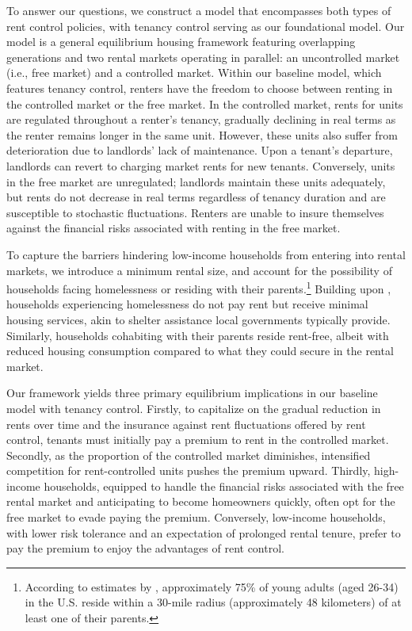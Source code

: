 \documentclass[parskip=full]{article}
\begin{document}
To answer our questions, we construct a model that encompasses both types of rent control policies, with tenancy control serving as our foundational model. Our model is a general equilibrium housing framework featuring overlapping generations and two rental markets operating in parallel: an uncontrolled market (i.e., free market) and a controlled market. Within our baseline model, which features tenancy control, renters have the freedom to choose between renting in the controlled market or the free market. In the controlled market, rents for units are regulated throughout a renter's tenancy, gradually declining in real terms as the renter remains longer in the same unit. However, these units also suffer from deterioration due to landlords' lack of maintenance. Upon a tenant's departure, landlords can revert to charging market rents for new tenants. Conversely, units in the free market are unregulated; landlords maintain these units adequately, but rents do not decrease in real terms regardless of tenancy duration and are susceptible to stochastic fluctuations. Renters are unable to insure themselves against the financial risks associated with renting in the free market.

To capture the barriers hindering low-income households from entering into rental markets, we introduce a minimum rental size, and account for the possibility of households facing homelessness or residing with their parents.\footnote{According to estimates by \citet{spatial_distance-2020}, approximately 75\% of young adults (aged 26-34) in the U.S. reside within a 30-mile radius (approximately 48 kilometers) of at least one of their parents.} Building upon \citet{az-2024}, households experiencing homelessness do not pay rent but receive minimal housing services, akin to shelter assistance local governments typically provide. Similarly, households cohabiting with their parents reside rent-free, albeit with reduced housing consumption compared to what they could secure in the rental market.

Our framework yields three primary equilibrium implications in our baseline model with tenancy control. Firstly, to capitalize on the gradual reduction in rents over time and the insurance against rent fluctuations offered by rent control, tenants must initially pay a premium to rent in the controlled market. Secondly, as the proportion of the controlled market diminishes, intensified competition for rent-controlled units pushes the premium upward. Thirdly, high-income households, equipped to handle the financial risks associated with the free rental market and anticipating to become homeowners quickly, often opt for the free market to evade paying the premium. Conversely, low-income households, with lower risk tolerance and an expectation of prolonged rental tenure, prefer to pay the premium to enjoy the advantages of rent control.
\end{document}
